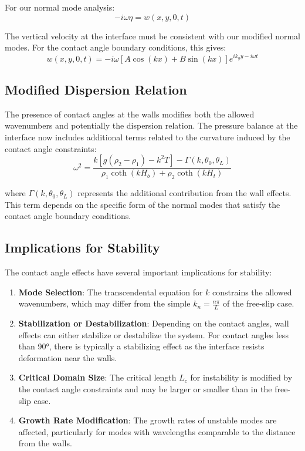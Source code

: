 \documentclass[12pt,a4paper]{article}
\begin{document}
For our normal mode analysis:
\begin{equation}
-i\omega\eta = w(x,y,0,t)
\end{equation}

The vertical velocity at the interface must be consistent with our modified normal modes. For the contact angle boundary conditions, this gives:
\begin{equation}
w(x,y,0,t) = -i\omega[A\cos(kx) + B\sin(kx)]e^{ik_y y - i\omega t}
\end{equation}

\subsection{Modified Dispersion Relation}
The presence of contact angles at the walls modifies both the allowed wavenumbers and potentially the dispersion relation. The pressure balance at the interface now includes additional terms related to the curvature induced by the contact angle constraints:
\begin{equation}
\omega^2 = \frac{k[g(\rho_2 - \rho_1) - k^2T] - \Gamma(k,\theta_0,\theta_L)}{\rho_1\coth(kH_b) + \rho_2\coth(kH_t)}
\end{equation}

where $\Gamma(k,\theta_0,\theta_L)$ represents the additional contribution from the wall effects. This term depends on the specific form of the normal modes that satisfy the contact angle boundary conditions.

\subsection{Implications for Stability}
The contact angle effects have several important implications for stability:

\begin{enumerate}
    \item \textbf{Mode Selection}: The transcendental equation for $k$ constrains the allowed wavenumbers, which may differ from the simple $k_n = \frac{n\pi}{L}$ of the free-slip case.
    
    \item \textbf{Stabilization or Destabilization}: Depending on the contact angles, wall effects can either stabilize or destabilize the system. For contact angles less than 90°, there is typically a stabilizing effect as the interface resists deformation near the walls.
    
    \item \textbf{Critical Domain Size}: The critical length $L_c$ for instability is modified by the contact angle constraints and may be larger or smaller than in the free-slip case.
    
    \item \textbf{Growth Rate Modification}: The growth rates of unstable modes are affected, particularly for modes with wavelengths comparable to the distance from the walls.
\end{enumerate}
\end{document}
